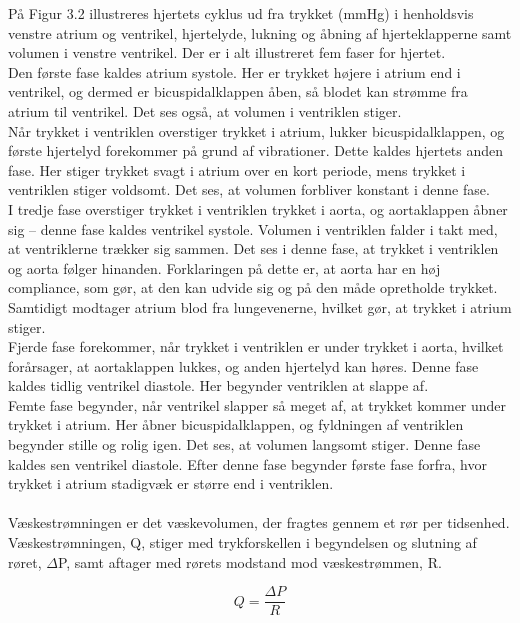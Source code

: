 På Figur 3.2 illustreres hjertets cyklus ud fra trykket (mmHg) i henholdsvis venstre atrium og ventrikel, hjertelyde, lukning og åbning af hjerteklapperne samt volumen i venstre ventrikel. Der er i alt illustreret fem faser for hjertet. \\
Den første fase kaldes atrium systole. Her er trykket højere i atrium end i ventrikel, og dermed er bicuspidalklappen åben, så blodet kan strømme fra atrium til ventrikel. Det ses også, at volumen i ventriklen stiger. \\
Når trykket i ventriklen overstiger trykket i atrium, lukker bicuspidalklappen, og første hjertelyd forekommer på grund af vibrationer. Dette kaldes hjertets anden fase. Her stiger trykket svagt i atrium over en kort periode, mens trykket i ventriklen stiger voldsomt. Det ses, at volumen forbliver konstant i denne fase. \\
I tredje fase overstiger trykket i ventriklen trykket i aorta, og aortaklappen åbner sig – denne fase kaldes ventrikel systole. Volumen i ventriklen falder i takt med, at ventriklerne trækker sig sammen. Det ses i denne fase, at trykket i ventriklen og aorta følger hinanden. Forklaringen på dette er, at aorta har en høj compliance, som gør, at den kan udvide sig og på den måde opretholde trykket. Samtidigt modtager atrium blod fra lungevenerne, hvilket gør, at trykket i atrium stiger. \\
Fjerde fase forekommer, når trykket i ventriklen er under trykket i aorta, hvilket forårsager, at aortaklappen lukkes, og anden hjertelyd kan høres. Denne fase kaldes tidlig ventrikel diastole. Her begynder ventriklen at slappe af. \\
Femte fase begynder, når ventrikel slapper så meget af, at trykket kommer under trykket i atrium. Her åbner bicuspidalklappen, og fyldningen af ventriklen begynder stille og rolig igen. Det ses, at volumen langsomt stiger. Denne fase kaldes sen ventrikel diastole. Efter denne fase begynder første fase forfra, hvor trykket i atrium stadigvæk er større end i ventriklen. 
\\\\
Væskestrømningen er det væskevolumen, der fragtes gennem et rør per tidsenhed. Væskestrømningen, Q, stiger med trykforskellen i begyndelsen og slutning af røret, $\Delta$P, samt aftager med rørets modstand mod væskestrømmen, R. 

\begin{equation}
Q = \frac{\Delta P}{R}
\end{equation}

